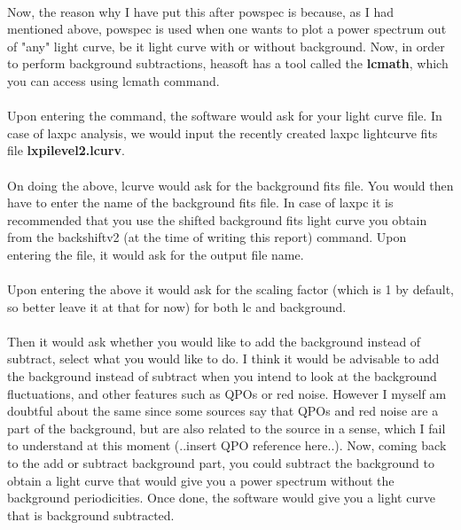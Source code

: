 \documentclass[a4paper,twoside]{report}
\numberwithin{equation}{section}
\begin{document}
\paragraph{}
Now, the reason why I have put this after powspec is because, as I had mentioned above, powspec is used when one wants to plot a power spectrum out of "any" light curve, be it light curve with or without background. Now, in order to perform background subtractions, heasoft has a tool called the \textbf{lcmath}, which you can access using lcmath command. 
\paragraph{}
Upon entering the command, the software would ask for your light curve file. In case of laxpc analysis, we would input the recently created laxpc lightcurve fits file \textbf{lxpilevel2.lcurv}. 
\paragraph{}
On doing the above, lcurve would ask for the background fits file. You would then have to enter the name of the background fits file. In case of laxpc it is recommended that you use the shifted background fits light curve you obtain from the backshiftv2 (at the time of writing this report) command. Upon entering the file, it would ask for the output file name. 
\paragraph{}
Upon entering the above it would ask for the scaling factor (which is 1 by default, so better leave it at that for now) for both lc and background. 
\paragraph{}
Then it would ask whether you would like to add the background instead of subtract, select what you would like to do. I think it would be advisable to add the background instead of subtract when you intend to look at the background fluctuations, and other features such as QPOs or red noise. However I myself am doubtful about the same since some sources say that QPOs and red noise are a part of the background, but are also related to the source in a sense, which I fail to understand at this moment (..insert QPO reference here..). Now, coming back to the add or subtract background part, you could subtract the background to obtain a light curve that would give you a power spectrum without the background periodicities. Once done, the software would give you a light curve that is background subtracted. 
\end{document}
